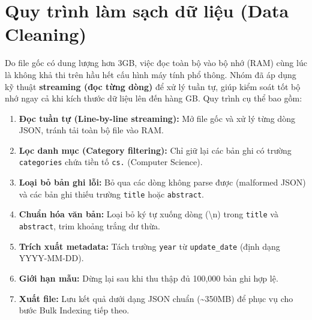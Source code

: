 \section{Quy trình làm sạch dữ liệu (Data Cleaning)}
Do file gốc có dung lượng hơn 3GB, việc đọc toàn bộ vào bộ nhớ (RAM) cùng lúc là không khả thi trên hầu hết cấu hình máy tính phổ thông. Nhóm đã áp dụng kỹ thuật \textbf{streaming (đọc từng dòng)} để xử lý tuần tự, giúp kiểm soát tốt bộ nhớ ngay cả khi kích thước dữ liệu lên đến hàng GB. Quy trình cụ thể bao gồm:
\begin{enumerate}
    \item \textbf{Đọc tuần tự (Line-by-line streaming):} Mở file gốc và xử lý từng dòng JSON, tránh tải toàn bộ file vào RAM.
    \item \textbf{Lọc danh mục (Category filtering):} Chỉ giữ lại các bản ghi có trường \texttt{categories} chứa tiền tố \texttt{cs.} (Computer Science).
    \item \textbf{Loại bỏ bản ghi lỗi:} Bỏ qua các dòng không parse được (malformed JSON) và các bản ghi thiếu trường \texttt{title} hoặc \texttt{abstract}.
    \item \textbf{Chuẩn hóa văn bản:} Loại bỏ ký tự xuống dòng (\textbackslash n) trong \texttt{title} và \texttt{abstract}, trim khoảng trắng dư thừa.
    \item \textbf{Trích xuất metadata:} Tách trường \texttt{year} từ \texttt{update\_date} (định dạng YYYY-MM-DD).
    \item \textbf{Giới hạn mẫu:} Dừng lại sau khi thu thập đủ 100,000 bản ghi hợp lệ.
    \item \textbf{Xuất file:} Lưu kết quả dưới dạng JSON chuẩn (\textasciitilde 350MB) để phục vụ cho bước Bulk Indexing tiếp theo.
\end{enumerate}